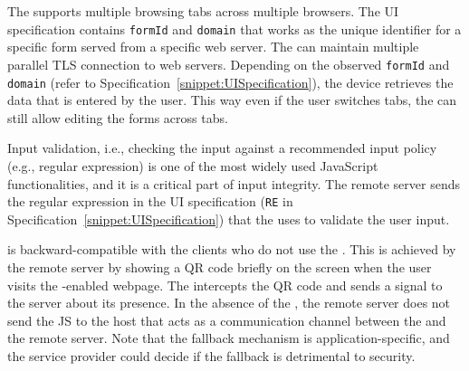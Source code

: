 \parasave
{}
The \device supports multiple browsing tabs across multiple browsers. The UI specification contains \texttt{formId} and \texttt{domain} that works as the unique identifier for a specific form served from a specific web server. The \device can maintain multiple parallel TLS connection to web servers. Depending on the observed \texttt{formId} and \texttt{domain} (refer to Specification~\ref{snippet:UISpecification}), the device retrieves the data that is entered by the user. This way even if the user switches tabs, the \device can still allow editing the forms across tabs.

\parasave
{} Input validation, i.e., checking the input against a recommended input policy (e.g., regular expression) is one of the most widely used JavaScript functionalities, and it is a critical part of input integrity. The remote server sends the regular expression in the UI specification (\texttt{RE} in Specification~\ref{snippet:UISpecification}) that the \device uses to validate the user input.


\parasave
{} \name is backward-compatible with the clients who do not use the \device. This is achieved by the remote server by showing a QR code briefly on the screen when the user visits the \name-enabled webpage. The \device intercepts the QR code and sends a signal to the server about its presence. In the absence of the \device, the remote server does not send the \name JS to the host that acts as a communication channel between the \device and the remote server. Note that the fallback mechanism is application-specific, and the service provider could decide if the fallback is detrimental to security.

